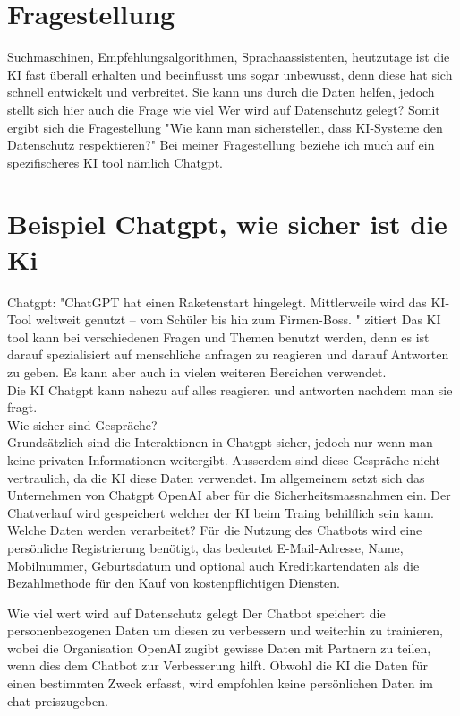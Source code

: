 \documentclass{article}
\begin{document}
    \section{Fragestellung}
    Suchmaschinen, Empfehlungsalgorithmen, Sprachaassistenten, heutzutage ist die KI fast überall erhalten und beeinflusst uns sogar unbewusst, denn diese hat sich schnell entwickelt und verbreitet. 
    Sie kann uns durch die Daten helfen, jedoch stellt sich hier auch die Frage wie viel Wer wird auf Datenschutz gelegt? 
    Somit ergibt sich die Fragestellung "Wie kann man sicherstellen, dass KI-Systeme den Datenschutz respektieren?"
    Bei meiner Fragestellung beziehe ich much auf ein spezifischeres KI tool nämlich Chatgpt. 
\\


\section{Beispiel Chatgpt, wie sicher ist die Ki}
    Chatgpt: "ChatGPT hat einen Raketenstart hingelegt. Mittlerweile wird das KI-Tool weltweit genutzt – vom Schüler bis hin zum Firmen-Boss. " zitiert 
    Das KI tool kann bei verschiedenen Fragen und Themen benutzt werden, denn es ist darauf spezialisiert auf menschliche anfragen zu reagieren und darauf Antworten zu geben. 
    Es kann aber auch in vielen weiteren Bereichen verwendet.\\
    Die KI Chatgpt kann nahezu auf alles reagieren und antworten nachdem man sie fragt. 
\\
    Wie sicher sind Gespräche? \\
    Grundsätzlich sind die Interaktionen in Chatgpt sicher, jedoch nur wenn man keine privaten Informationen weitergibt. Ausserdem sind diese Gespräche nicht vertraulich, da die KI diese Daten verwendet.
    Im allgemeinem setzt sich das Unternehmen von Chatgpt OpenAI aber für die Sicherheitsmassnahmen ein.
    Der Chatverlauf wird gespeichert welcher der KI beim Traing behilflich sein kann.
    Welche Daten werden verarbeitet? 
    Für die Nutzung des Chatbots wird eine persönliche Registrierung benötigt, das bedeutet E-Mail-Adresse, Name, Mobilnummer, Geburtsdatum und optional auch Kreditkartendaten als die Bezahlmethode für den Kauf von kostenpflichtigen Diensten.

    Wie viel wert wird auf Datenschutz gelegt
    Der Chatbot speichert die personenbezogenen Daten um diesen zu verbessern und weiterhin zu trainieren, wobei die Organisation OpenAI zugibt gewisse Daten mit Partnern zu teilen, wenn dies dem Chatbot zur Verbesserung hilft.
    Obwohl die KI die Daten für einen bestimmten Zweck erfasst, wird empfohlen keine persönlichen Daten im chat preiszugeben.
\end{document}
